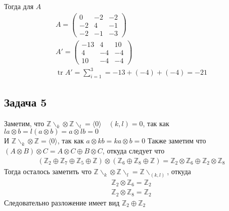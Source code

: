 Тогда для $A$
\begin{gather*}
A = 
\begin{pmatrix}
	0 & -2 & -2\\
	-2 & 4 & -1\\
	-2 & -1 & -3
\end{pmatrix}\\
A' =
\begin{pmatrix}
	-13 & 4 & 10\\
	4 & -4 & -4\\
	10 & -4 & -4
\end{pmatrix}\\
\operatorname{tr}A'= \sum\limits_{i = 1}^{3} = -13 + (-4) + (-4) = -21
\end{gather*}



\subsection*{Задача 5}
Заметим, что $\mathbb{Z}\backslash_k \otimes \mathbb{Z}\backslash_l = \langle 0 \rangle\quad (k,l) = 0$, так как $la \otimes b = l(a \otimes b) = a \otimes lb = 0$\\
И $\mathbb{Z}\backslash_k \otimes \mathbb{Z} = \langle 0 \rangle$, так как $a \otimes kb = ka \otimes b = 0$
\vskip 0.2in
Также заметим что $(A \otimes B) \otimes C = A \otimes C \oplus B \otimes C$, откуда следует что\\
\begin{gather*}
	(\mathbb{Z}_2 \oplus \mathbb{Z}_7 \oplus \mathbb{Z}_5 \oplus \mathbb{Z}) \otimes (\mathbb{Z}_6 \oplus \mathbb{Z}_8 \oplus \mathbb{Z}) = \mathbb{Z}_2 \otimes \mathbb{Z}_6 \oplus \mathbb{Z}_2 \otimes \mathbb{Z}_8
\end{gather*}
Тогда осталось заметить что $\mathbb{Z}\backslash_k \otimes \mathbb{Z}\backslash_l = \mathbb{Z}\backslash_{(k,l)}$, откуда
\begin{gather*}
	\mathbb{Z}_2 \otimes \mathbb{Z}_6 = \mathbb{Z}_2\\
	\mathbb{Z}_2 \otimes \mathbb{Z}_8 = \mathbb{Z}_2
\end{gather*}
Следовательно разложение имеет вид $\mathbb{Z}_2 \oplus \mathbb{Z}_2$